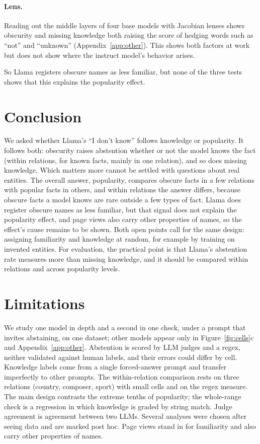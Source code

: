 \documentclass[letterpaper]{article} %
\newcommand{\idk}{``I don't know''}
\begin{document}
\paragraph{Lens.}
Reading out the middle layers of four base models with Jacobian lenses \citep{gurnee2026verbalizable} shows obscurity and missing knowledge both raising the score of hedging words such as ``not'' and ``unknown'' (Appendix~\ref{app:other}). This shows both factors at work but does not show where the instruct model's behavior arises.

So Llama registers obscure names as less familiar, but none of the three tests shows that this explains the popularity effect.

\section{Conclusion}

We asked whether Llama's \idk{} follows knowledge or popularity. It follows both: obscurity raises abstention whether or not the model knows the fact (within relations, for known facts, mainly in one relation), and so does missing knowledge. Which matters more cannot be settled with questions about real entities. The overall answer, popularity, compares obscure facts in a few relations with popular facts in others, and within relations the answer differs, because obscure facts a model knows are rare outside a few types of fact. Llama does register obscure names as less familiar, but that signal does not explain the popularity effect, and page views also carry other properties of names, so the effect's cause remains to be shown. Both open points call for the same design: assigning familiarity and knowledge at random, for example by training on invented entities. For evaluation, the practical point is that Llama's abstention rate measures more than missing knowledge, and it should be compared within relations and across popularity levels.

\section*{Limitations}

We study one model in depth and a second in one check, under a prompt that invites abstaining, on one dataset; other models appear only in Figure~\ref{fig:cells}c and Appendix~\ref{app:other}. Abstention is scored by LLM judges and a regex, neither validated against human labels, and their errors could differ by cell. Knowledge labels come from a single forced-answer prompt and transfer imperfectly to other prompts. The within-relation comparison rests on three relations (country, composer, sport) with small cells and on the regex measure. The main design contrasts the extreme tenths of popularity; the whole-range check is a regression in which knowledge is graded by string match. Judge agreement is agreement between two LLMs. Several analyses were chosen after seeing data and are marked post hoc. Page views stand in for familiarity and also carry other properties of names.
\end{document}

